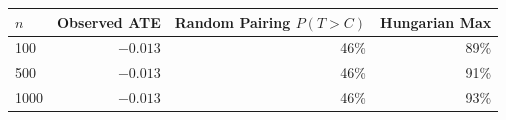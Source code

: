 \begin{tabular}{lrrr}
\toprule
$n$ & Observed ATE & Random Pairing $P(T > C)$ & Hungarian Max \\
\midrule
100 & $-0.013$ & 46\% & 89\% \\
500 & $-0.013$ & 46\% & 91\% \\
1000 & $-0.013$ & 46\% & 93\% \\
\bottomrule
\end{tabular}
